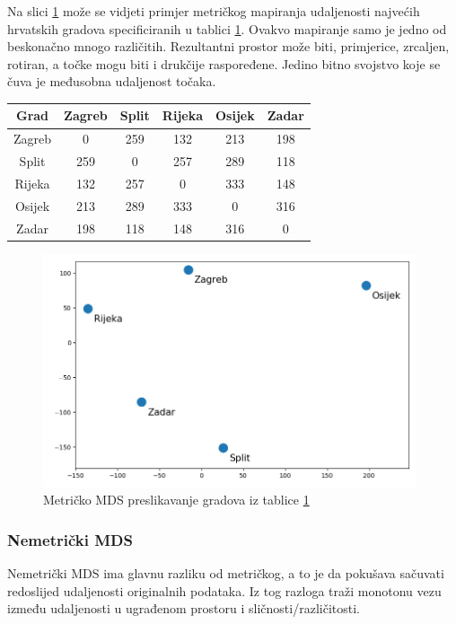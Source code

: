 \documentclass[times, utf8, diplomski]{fer}
\begin{document}
Na slici \ref{fig:mds_mapping_hr_metric} može se vidjeti primjer metričkog mapiranja udaljenosti najvećih hrvatskih gradova specificiranih u tablici \ref{tab:hr_cities}. Ovakvo mapiranje samo je jedno od beskonačno mnogo različitih. Rezultantni prostor može biti, primjerice, zrcaljen, rotiran, a točke mogu biti i drukčije raspoređene. Jedino bitno svojstvo koje se čuva je međusobna udaljenost točaka.

\begin{table}[htb]
    \centering
    \begin{tabular}{|c|c|c|c|c|c|}
        \hline
        Grad   & Zagreb & Split & Rijeka & Osijek & Zadar \\\hline
        Zagreb & 0      & 259   & 132    & 213    & 198   \\\hline
        Split  & 259    & 0     & 257    & 289    & 118   \\\hline
        Rijeka & 132    & 257   & 0      & 333    & 148   \\\hline
        Osijek & 213    & 289   & 333    & 0      & 316   \\\hline
        Zadar  & 198    & 118   & 148    & 316    & 0     \\\hline
    \end{tabular}
    \label{tab:hr_cities}
\end{table}
\begin{figure}[htb]
    \centering
    \includegraphics[width=11cm]{resources/images/reduction/mds_mapping_hr_metric.png}
    \caption{Metričko MDS preslikavanje gradova iz tablice \ref{tab:hr_cities}}
    \label{fig:mds_mapping_hr_metric}
\end{figure}


\subsubsection{Nemetrički MDS}
Nemetrički MDS  ima glavnu razliku od metričkog, a to je da pokušava sačuvati redoslijed udaljenosti originalnih podataka. Iz tog razloga traži monotonu vezu između udaljenosti u ugrađenom prostoru i sličnosti/različitosti.
\end{document}
